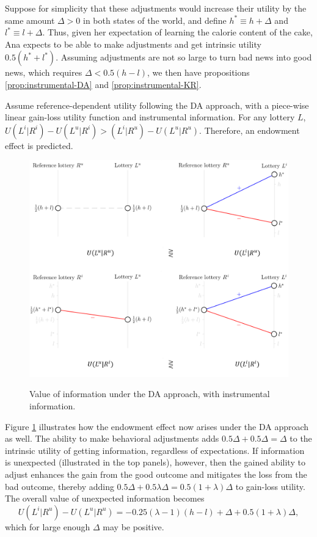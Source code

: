 Suppose for simplicity that these adjustments would increase their utility by the same amount $\Delta > 0$ in both states of the world, and define $h^* \equiv h+\Delta$ and $l^* \equiv l+\Delta$. Thus, given her expectation of learning the calorie content of the cake, Ana expects to be able to make adjustments and get intrinsic utility $0.5(h^*+l^*)$. Assuming adjustments are not so large to turn bad news into good news, which requires $\Delta <0.5(h-l)$, we then have propositions \ref{prop:instrumental-DA} and \ref{prop:instrumental-KR}.

\begin{prop}
  Assume reference-dependent utility following the DA approach, with a piece-wise linear gain-loss utility function and instrumental information. For any lottery $L$, $U(L^i|R^i)-U(L^u|R^i)>(L^i|R^u)-U(L^u|R^u)$. Therefore, an endowment effect is predicted.
  \label{prop:instrumental-DA}
\end{prop}

\begin{figure}[ht]
  \caption{Value of information under the DA approach, with instrumental information.}\label{fig:instrumental-DA}
  \begin{center}
  {\includegraphics[width=1\textwidth]{./figures/theory_fig3.png}}
  \end{center}
\end{figure}

Figure \ref{fig:instrumental-DA} illustrates how the endowment effect now arises under the DA approach as well. The ability to make behavioral adjustments adds $0.5 \Delta + 0.5 \Delta = \Delta$ to the intrinsic utility of getting information, regardless of expectations. If information is unexpected (illustrated in the top panels), however, then the gained ability to adjust enhances the gain from the good outcome and mitigates the loss from the bad outcome, thereby adding $0.5 \Delta + 0.5 \lambda \Delta = 0.5 (1 + \lambda) \Delta$ to gain-loss utility. The overall value of unexpected information becomes
\begin{equation*}
  U(L^i|R^u)-U(L^u|R^u)=-0.25(\lambda-1)(h-l)+\Delta +0.5(1+\lambda)\Delta,
\end{equation*}
which for large enough $\Delta$ may be positive.


